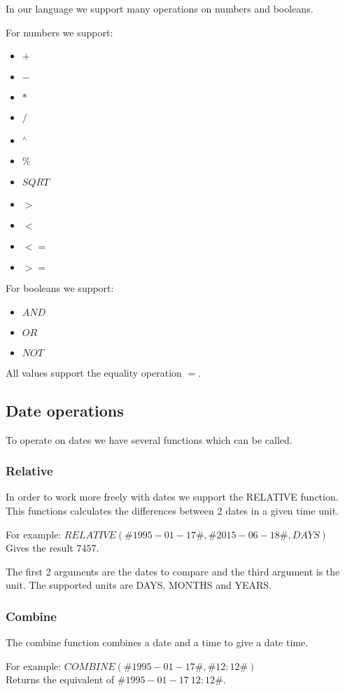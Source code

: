In our language we support many operations on numbers and booleans.

For numbers we support:
\begin{itemize}
	\item $+$
	\item $-$
	\item $*$
	\item $/$
	\item $^\wedge$
	\item $\%$
	\item $SQRT$
	\item $>$
	\item $<$
	\item $<=$
	\item $>=$
\end{itemize}

For booleans we support:
\begin{itemize}
	\item $AND$
	\item $OR$
	\item $NOT$
\end{itemize}

All values support the equality operation $=$.

\subsection{Date operations}
To operate on dates we have several functions which can be called.

\subsubsection{Relative}
In order to work more freely with dates we support the RELATIVE function. This functions calculates the differences between 2 dates in a given time unit.

For example:
$RELATIVE(\#1995-01-17\#, \#2015-06-18\#, DAYS)$ \\
Gives the result $7457$.

The first 2 arguments are the dates to compare and the third argument is the unit. The supported units are DAYS, MONTHS and YEARS.

\subsubsection{Combine}
The combine function combines a date and a time to give a date time.

For example:
$COMBINE(\#1995-01-17\#, \#12:12\#)$ \\
Returns the equivalent of $\#1995-01-17\ 12:12\#$.

